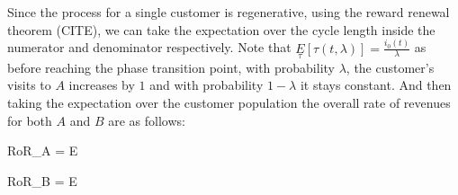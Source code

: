Since the process for a single customer is regenerative, using the reward renewal theorem (CITE), we can take the expectation over the cycle length inside the numerator and denominator respectively.
Note that $\underset{\tau}E[\tau(t,\lambda)] = \frac{i_0(t)}{\lambda}$ as before reaching the phase transition point, with probability $\lambda$, the customer's visits to $A$ increases by $1$ and with probability $1-\lambda$ it stays constant.
And then taking the expectation over the customer population the overall rate of revenues for both $A$ and $B$ are as follows:

\beq
RoR_A = E
\eeq

\beq
RoR_B = E
\eeq
